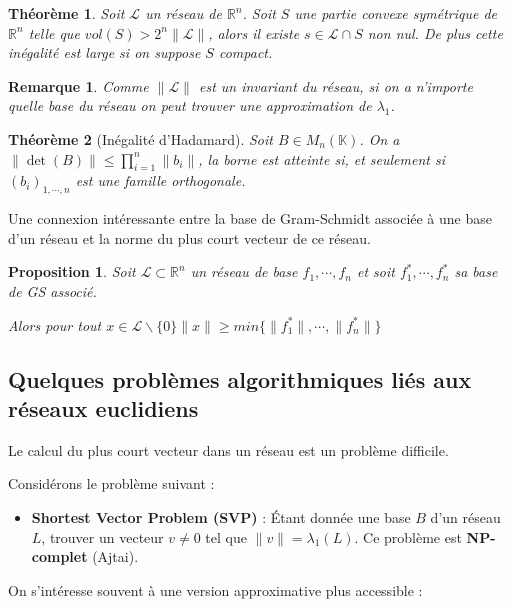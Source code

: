 \documentclass[a4paper,12pt]{report}  %
\theoremstyle{definitionstyle}
\theoremstyle{examplestyle}
\theoremstyle{remarkstyle}
\newtheorem{remark}{Remarque}[chapter] %
\theoremstyle{propositionstyle}
\newtheorem{proposition}{Proposition}[chapter]  %
\theoremstyle{theoremstyle}
\newtheorem{theoreme}{Théorème}[chapter]  %
\theoremstyle{proofstyle}
\begin{document}
\begin{theoreme}
	Soit $\mathcal{L}$ un réseau de $\mathbb{R}^n$. Soit $S$ une partie convexe symétrique de $\mathbb{R}^n$ telle que $vol(S) > 2^n \|\mathcal{L}\|$, alors il existe $s \in \mathcal{L} \cap S$ non nul. De plus cette inégalité est large si on suppose $S$ compact.
\end{theoreme}

\begin{remark}
	Comme $\|\mathcal{L}\|$ est un invariant du réseau, si on a n'importe quelle base du réseau on peut trouver une approximation de $\lambda_1$.
\end{remark}

\begin{theoreme}[Inégalité d'Hadamard]
Soit $B \in M_n(\mathbb{K})$. On a $\|\det(B)\| \leq \prod_{i=1}^{n} \| b_i \|$, la borne est atteinte si, et seulement si $(b_i)_{1, \cdots, n}$ est une famille orthogonale.	
\end{theoreme}

Une connexion intéressante entre la base de Gram-Schmidt associée à une base d’un réseau et la norme du plus court vecteur de ce réseau.

\begin{proposition}
Soit $\mathcal{L} \subset \mathbb{R}^n$ un réseau de base $f_1, \cdots, f_n$ et soit $f_1^*, \cdots, f_n^*$ sa base de GS associé.

Alors pour tout $x \in \mathcal{L} \backslash \{0\} \|x\| \geq min \{\|f_1^*\|, \cdots, \|f_n^*\|\}$
\end{proposition}


	\subsection{Quelques problèmes algorithmiques liés aux réseaux euclidiens}
	
	Le calcul du plus court vecteur dans un réseau est un problème difficile.
	
	Considérons le problème suivant :
	
	\begin{itemize}
		\item \textbf{Shortest Vector Problem (SVP)} : Étant donnée une base $B$ d’un réseau $L$, trouver un vecteur $v \neq 0$ tel que $\|v\| = \lambda_1(L)$. Ce problème est \textbf{NP-complet} (Ajtai).
	\end{itemize}
	
	On s’intéresse souvent à une version approximative plus accessible :
	
\end{document}
